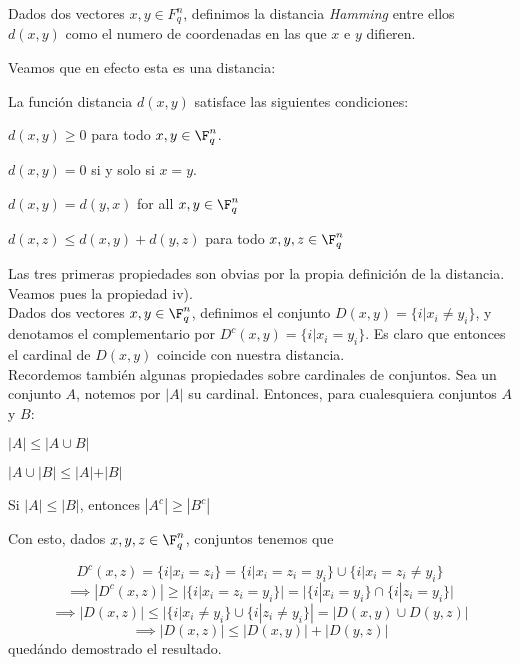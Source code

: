 \begin{definition}
Dados dos vectores \(x, y \in F_q^n\), definimos la distancia \textit{Hamming} entre ellos \(d(x,y)\) como el numero de coordenadas en las que  \(x\) e \(y\) difieren.
\end{definition}

Veamos que en efecto esta es una distancia:

\begin{proposition}
La función distancia \(d(x,y)\) satisface las siguientes condiciones:
\begin{nlist}
    \item \(d(x,y) \geq 0\) para todo \(x, y \in \F_q^n\).
    \item \(d(x,y) = 0\) si y solo si \(x = y\).
    \item \(d(x,y) = d(y,x)\) for all \(x,y \in \F_q^n\)
    \item \(d(x,z) \leq d(x,y) + d(y,z)\) para todo \(x, y, z \in \F_q^n\)
\end{nlist}

\begin{proofs}
Las tres primeras propiedades son obvias por la propia definición de la distancia. Veamos pues la propiedad iv).\\

Dados dos vectores \(x, y \in \F_q^n\), definimos el conjunto \(D(x,y) = \{i | x_i \neq y_i\}\), y denotamos el complementario por \(D^c(x, y) = \{i | x_i = y_i\}\). Es claro que entonces el cardinal de \(D(x,y)\) coincide con nuestra distancia. \\

Recordemos también algunas propiedades sobre cardinales de conjuntos. Sea un conjunto \(A\), notemos por \(|A|\) su cardinal. Entonces, para cualesquiera conjuntos \(A\) y \(B\):
\begin{nlist}
    \item \(|A| \leq |A \cup B|\)
    \item \(|A \cup |B| \leq |A| + |B|\)
    \item Si \(|A| \leq |B|\), entonces \(|A^c| \geq |B^c|\)
\end{nlist}
Con esto, dados \(x, y, z \in \F_q^n\), conjuntos tenemos que

\[
D^c(x,z) = \{i | x_i = z_i\} = \{i | x_i = z_i = y_i\} \cup \{i | x_i = z_i \neq y_i\}
\]
\[
\implies |D^c(x,z)| \geq |\{i | x_i = z_i = y_i\}| = |\{i | x_i = y_i\} \cap \{i | z_i = y_i\}|
\]
\[
\implies |D(x,z)| \leq |\{i | x_i \neq y_i\} \cup \{i | z_i \neq y_i\}| = |D(x,y) \cup D(y,z)|
\]
\[
\implies |D(x,z)| \leq |D(x,y)| + |D(y,z)|
\]
quedándo demostrado el resultado.
\end{proofs}
\end{proposition}

